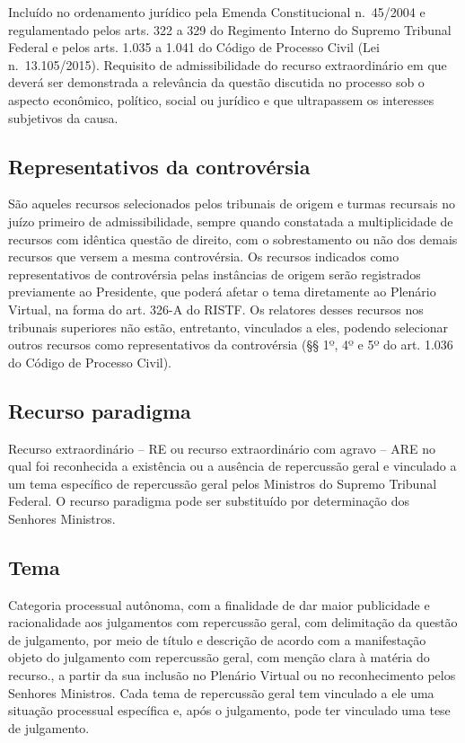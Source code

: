 \documentclass[
]{book}
\begin{document}
Incluído no ordenamento jurídico pela Emenda Constitucional n.~45/2004 e regulamentado pelos arts. 322 a 329 do Regimento Interno do Supremo Tribunal Federal e pelos arts. 1.035 a 1.041 do Código de Processo Civil (Lei n.~13.105/2015).
Requisito de admissibilidade do recurso extraordinário em que deverá ser demonstrada a relevância da questão discutida no processo sob o aspecto econômico, político, social ou jurídico e que ultrapassem os interesses subjetivos da causa.

\hypertarget{representativos-da-controvuxe9rsia}{%
\subsection{Representativos da controvérsia}\label{representativos-da-controvuxe9rsia}}

São aqueles recursos selecionados pelos tribunais de origem e turmas recursais no juízo primeiro de admissibilidade, sempre quando constatada a multiplicidade de recursos com idêntica questão de direito, com o sobrestamento ou não dos demais recursos que versem a mesma controvérsia. Os recursos indicados como representativos de controvérsia pelas instâncias de origem serão registrados previamente ao Presidente, que poderá afetar o tema diretamente ao Plenário Virtual, na forma do art. 326-A do RISTF. Os relatores desses recursos nos tribunais superiores não estão, entretanto, vinculados a eles, podendo selecionar outros recursos como representativos da controvérsia (§§ 1º, 4º e 5º do art. 1.036 do Código de Processo Civil).

\hypertarget{recurso-paradigma}{%
\subsection{Recurso paradigma}\label{recurso-paradigma}}

Recurso extraordinário -- RE ou recurso extraordinário com agravo -- ARE no qual foi reconhecida a existência ou a ausência de repercussão geral e vinculado a um tema específico de repercussão geral pelos Ministros do Supremo Tribunal Federal. O recurso paradigma pode ser substituído por determinação dos Senhores Ministros.

\hypertarget{tema}{%
\subsection{Tema}\label{tema}}

Categoria processual autônoma, com a finalidade de dar maior publicidade e racionalidade aos julgamentos com repercussão geral, com delimitação da questão de julgamento, por meio de título e descrição de acordo com a manifestação objeto do julgamento com repercussão geral, com menção clara à matéria do recurso., a partir da sua inclusão no Plenário Virtual ou no reconhecimento pelos Senhores Ministros. Cada tema de repercussão geral tem vinculado a ele uma situação processual específica e, após o julgamento, pode ter vinculado uma tese de julgamento.
\end{document}
